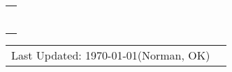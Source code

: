 \documentclass[10pt,letterpaper]{article}
\begin{document}
\begin{tabular}{p{4.25 in}p{3.75in}}
	\multicolumn{2}{p{7.5in}}{\hrule}
\end{tabular}

\vspace{1.5cm}
\begin{tabular}{p{3.5in}p{3.5in}}\\
	Last Updated: \today \hspace{0.1 cm}(Norman, OK) &\\
\end{tabular}
\end{document}

